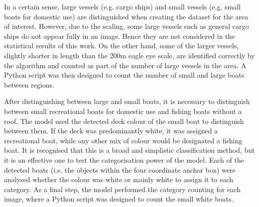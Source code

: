 In a certain sense, large vessels (e.g. cargo ships) and small vessels (e.g. small boats for domestic use) are distinguished when creating the dataset for the area of interest. However, due to the scaling, some large vessels such as general cargo ships do not appear fully in an image. Hence they are not considered in the statistical results of this work. On the other hand, some of the larger vessels, slightly shorter in length than the 200m eagle eye scale, are identified correctly by the algorithm and counted as part of the number of large vessels in the area. A Python script was then designed to count the number of small and large boats between regions.

After distinguishing between large and small boats, it is necessary to distinguish between small recreational boats for domestic use and fishing boats without a roof. The model used the detected deck colour of the small boat to distinguish between them. If the deck was predominantly white, it was assigned a recreational boat, while any other mix of colour would be designated a fishing boat. It is recognised that this is a broad and simplistic classification method, but it is an effective one to test the categorisation power of the model. Each of the detected boats (i.e. the objects within the four coordinate anchor box) were analysed whether the colour was white or mainly white to assign it to each category. As a final step, the model performed the category counting for each image, where a Python script was designed to count the small white boats.
